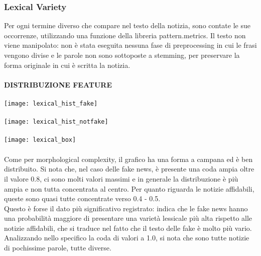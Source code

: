 \documentclass{article}
\begin{document}
\begin{multicols}{2}
				\subsubsection{Lexical Variety}
				Per ogni termine diverso che compare nel testo della notizia, sono contate le sue occorrenze, utilizzando una funzione della libreria pattern.metrics. Il testo non viene manipolato: non è stata eseguita nessuna fase di preprocessing in cui le frasi vengono divise e le parole non sono sottoposte a stemming, per preservare la forma originale in cui è scritta la notizia.
				\\~\\								
				\textbf{DISTRIBUZIONE FEATURE}						
				\\~\\
				\texttt{[image: lexical\_hist\_fake]}
				\\~\\
				\texttt{[image: lexical\_hist\_notfake]}
				\\~\\
				\texttt{[image: lexical\_box]}
				\\~\\
				Come per morphological complexity, il grafico ha una forma a campana ed è ben distribuito. Si nota che, nel caso delle fake news, è presente una coda ampia oltre il valore 0.8, ci sono molti valori massimi e in generale la distribuzione è più ampia e non tutta concentrata al centro. Per quanto riguarda le notizie affidabili, queste sono quasi tutte concentrate verso 0.4 - 0.5.\\
				Questo è forse il dato più significativo registrato: indica che le fake news hanno una probabilità maggiore di presentare una varietà lessicale più alta rispetto alle notizie affidabili, che si traduce nel fatto che il testo delle fake è molto più vario. Analizzando nello specifico la coda di valori a 1.0, si nota che sono tutte notizie di pochissime parole, tutte diverse.\\~\\
				

\end{multicols}
\end{document}

